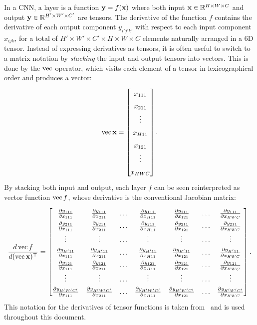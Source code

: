 In a CNN, a layer is a function $\mathbf{y} = f(\mathbf{x})$ where both input $\mathbf{x} \in \mathbb{R}^{H\times W \times C}$ and output $\mathbf{y} \in \mathbb{R}^{H'\times W' \times C'}$ are tensors. The derivative of the function $f$ contains the derivative of each output component $y_{i'j'k'}$ with respect to each input component $x_{ijk}$, for a total of $H'\times W'\times C'\times H\times W\times C$ elements naturally arranged in a 6D tensor. Instead of expressing derivatives as tensors, it is often useful  to switch to a matrix notation by \emph{stacking} the input and output tensors into vectors. This is done by the $\operatorname{vec}$ operator, which visits each element of a tensor in lexicographical order and produces a vector:
\[
\vv \bx
=
\begin{bmatrix}
x_{111} \\
x_{211} \\
\vdots
\\
x_{H11} \\
x_{121} \\
\vdots \\
x_{HWC}  	
\end{bmatrix}.
\]
By stacking both input and output, each layer $f$ can be seen reinterpreted as vector function $\operatorname{vec} f$, whose derivative is the conventional Jacobian matrix:
\[
\renewcommand*{\arraystretch}{1.5}
\frac{d \vv f}{d(\vv \bx)^\top}
=
\begin{bmatrix}
\frac{\partial y_{111}}{\partial x_{111}} & 
\frac{\partial y_{111}}{\partial x_{211}} &
\dots &
\frac{\partial y_{111}}{\partial x_{H11}} &
\frac{\partial y_{111}}{\partial x_{121}} &
\dots &
\frac{\partial y_{111}}{\partial x_{HWC}} \\
\frac{\partial y_{211}}{\partial x_{111}} & 
\frac{\partial y_{211}}{\partial x_{211}} &
\dots &
\frac{\partial y_{211}}{\partial x_{H11}} &
\frac{\partial y_{211}}{\partial x_{121}} &
\dots &
\frac{\partial y_{211}}{\partial x_{HWC}} \\
\vdots & \vdots & \dots & \vdots & \vdots & \dots & \vdots \\
\frac{\partial y_{H'11}}{\partial x_{111}} & 
\frac{\partial y_{H'11}}{\partial x_{211}} &
\dots &
\frac{\partial y_{H'11}}{\partial x_{H11}} &
\frac{\partial y_{H'11}}{\partial x_{121}} &
\dots &
\frac{\partial y_{H'11}}{\partial x_{HWC}} \\
\frac{\partial y_{121}}{\partial x_{111}} & 
\frac{\partial y_{121}}{\partial x_{211}} &
\dots &
\frac{\partial y_{121}}{\partial x_{H11}} &
\frac{\partial y_{121}}{\partial x_{121}} &
\dots &
\frac{\partial y_{121}}{\partial x_{HWC}} \\
\vdots & \vdots & \dots & \vdots & \vdots & \dots & \vdots \\
\frac{\partial y_{H'W'C'}}{\partial x_{111}} & 
\frac{\partial y_{H'W'C'}}{\partial x_{211}} &
\dots &
\frac{\partial y_{H'W'C'}}{\partial x_{H11}} &
\frac{\partial y_{H'W'C'}}{\partial x_{121}} &
\dots &
\frac{\partial y_{H'W'C'}}{\partial x_{HWC}}
\end{bmatrix}.
\]
This notation for the derivatives of tensor functions is taken from~\cite{kinghorn96integrals} and is used throughout this document.

